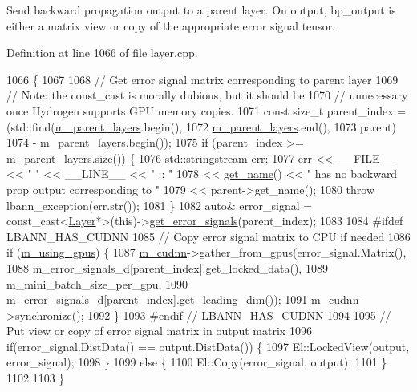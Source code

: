 Send backward propagation output to a parent layer. On output, bp\+\_\+output is either a matrix view or copy of the appropriate error signal tensor. 

Definition at line 1066 of file layer.\+cpp.


\begin{DoxyCode}
1066                                                                        \{
1067 
1068   \textcolor{comment}{// Get error signal matrix corresponding to parent layer}
1069   \textcolor{comment}{// Note: the const\_cast is morally dubious, but it should be}
1070   \textcolor{comment}{// unnecessary once Hydrogen supports GPU memory copies.}
1071   \textcolor{keyword}{const} \textcolor{keywordtype}{size\_t} parent\_index = (std::find(\hyperlink{classlbann_1_1Layer_a3fa7c6cf1a22bb14ab0e85e3dc6027c5}{m\_parent\_layers}.begin(),
1072                                          \hyperlink{classlbann_1_1Layer_a3fa7c6cf1a22bb14ab0e85e3dc6027c5}{m\_parent\_layers}.end(),
1073                                          parent)
1074                                - \hyperlink{classlbann_1_1Layer_a3fa7c6cf1a22bb14ab0e85e3dc6027c5}{m\_parent\_layers}.begin());
1075   \textcolor{keywordflow}{if} (parent\_index >= \hyperlink{classlbann_1_1Layer_a3fa7c6cf1a22bb14ab0e85e3dc6027c5}{m\_parent\_layers}.size()) \{
1076     std::stringstream err;
1077     err << \_\_FILE\_\_ << \textcolor{stringliteral}{" "} << \_\_LINE\_\_ << \textcolor{stringliteral}{" :: "}
1078         << \hyperlink{classlbann_1_1Layer_a80027550202fa7dbb1dd55fa8a66c84b}{get\_name}() << \textcolor{stringliteral}{" has no backward prop output corresponding to "}
1079         << parent->get\_name();
1080     \textcolor{keywordflow}{throw} lbann\_exception(err.str());
1081   \}
1082   \textcolor{keyword}{auto}& error\_signal = \textcolor{keyword}{const\_cast<}\hyperlink{classlbann_1_1Layer_a24e9c82354a0a2af1b70cbca2211e7d4}{Layer}*\textcolor{keyword}{>}(\textcolor{keyword}{this})->\hyperlink{classlbann_1_1Layer_adb561e140e0bb601f3c5a8ee053a71d2}{get\_error\_signals}(parent\_index);
1083 
1084 \textcolor{preprocessor}{#ifdef LBANN\_HAS\_CUDNN}
1085   \textcolor{comment}{// Copy error signal matrix to CPU if needed}
1086   \textcolor{keywordflow}{if} (\hyperlink{classlbann_1_1Layer_af7881cb5eff5207c15fa835d65462e8f}{m\_using\_gpus}) \{
1087     \hyperlink{classlbann_1_1Layer_a08dbb94239e3b8c96329786c57c72e21}{m\_cudnn}->gather\_from\_gpus(error\_signal.Matrix(),
1088                               m\_error\_signals\_d[parent\_index].get\_locked\_data(),
1089                               m\_mini\_batch\_size\_per\_gpu,
1090                               m\_error\_signals\_d[parent\_index].get\_leading\_dim());
1091     \hyperlink{classlbann_1_1Layer_a08dbb94239e3b8c96329786c57c72e21}{m\_cudnn}->synchronize();
1092   \}
1093 \textcolor{preprocessor}{#endif // LBANN\_HAS\_CUDNN}
1094 
1095   \textcolor{comment}{// Put view or copy of error signal matrix in output matrix}
1096   \textcolor{keywordflow}{if}(error\_signal.DistData() == output.DistData()) \{
1097     El::LockedView(output, error\_signal);
1098   \}
1099   \textcolor{keywordflow}{else} \{
1100     El::Copy(error\_signal, output);
1101   \}
1102 
1103 \}
\end{DoxyCode}
